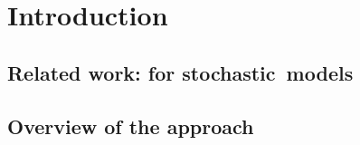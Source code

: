 \chapter{Introduction}
\label{chap:intro}


\section{Related work:  for stochastic~models}
\label{sec:intro:relwork}

\section{Overview of the approach}
\label{sec:intro:approach}


